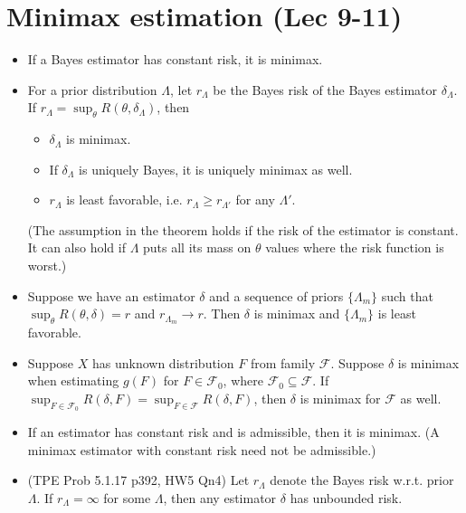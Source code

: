 \documentclass[twoside]{article}
\newcommand\calF{\mathcal{F}}
\newcommand\dlt{\delta}
\newcommand\Lmb{\Lambda}
\def\t{\theta}
\newcommand\goesto{\rightarrow}
\begin{document}
\section*{Minimax estimation (Lec 9-11)}
\begin{itemize}
\item If a Bayes estimator has constant risk, it is minimax.

\item For a prior distribution $\Lmb$, let $r_\Lmb$ be the Bayes risk of the Bayes estimator $\dlt_\Lmb$. If $r_\Lmb = \displaystyle\sup_\t R(\t, \dlt_\Lmb)$, then
\begin{itemize}
\item $\dlt_\Lmb$ is minimax.
\item If $\dlt_\Lmb$ is uniquely Bayes, it is uniquely minimax as well.
\item $r_\Lmb$ is least favorable, i.e. $r_\Lmb \geq r_{\Lmb'}$ for any $\Lmb'$.
\end{itemize}
(The assumption in the theorem holds if the risk of the estimator is constant. It can also hold if $\Lmb$ puts all its mass on $\t$ values where the risk function is worst.)

\item Suppose we have an estimator $\dlt$ and a sequence of priors $\{ \Lmb_m \}$ such that $\displaystyle\sup_\t R(\t, \dlt) = r$ and $r_{\Lmb_m} \goesto r$. Then $\dlt$ is minimax and $\{ \Lmb_m \}$ is least favorable.

\item Suppose $X$ has unknown distribution $F$ from family $\calF$. Suppose $\dlt$ is minimax when estimating $g(F)$ for $F \in \calF_0$, where $\calF_0 \subseteq \calF$. If $\displaystyle\sup_{F \in \calF_0} R(\dlt, F) = \displaystyle\sup_{F \in \calF} R(\dlt, F)$, then $\dlt$ is minimax for $\calF$ as well.

\item If an estimator has constant risk and is admissible, then it is minimax. (A minimax estimator with constant risk need not be admissible.)

\item (TPE Prob 5.1.17 p392, HW5 Qn4) Let $r_\Lmb$ denote the Bayes risk w.r.t. prior $\Lmb$. If $r_\Lmb = \infty$ for some $\Lmb$, then any estimator $\dlt$ has unbounded risk.
\end{itemize}
\end{document}
